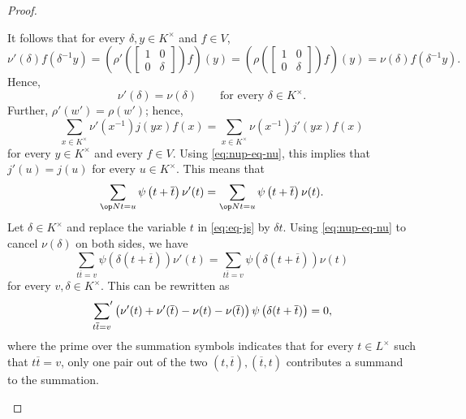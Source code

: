 \documentclass[../main.tex]{subfiles}
\begin{document}
\begin{proof}
\begin{listalph}
		It follows that for every $\delta,y\in K^\times$ and $f\in V$,
		\[\nu'(\delta)f\left(\delta^{-1}y\right)=\left(\rho'\left(\begin{bmatrix}
			1 & 0 \\
			0 & \delta
		\end{bmatrix}\right)f\right)(y)=\left(\rho\left(\begin{bmatrix}
			1 & 0 \\
			0 & \delta
		\end{bmatrix}\right)f\right)(y)=\nu(\delta)f\left(\delta^{-1}y\right).\]
		Hence,
		\begin{equation}
			\nu'(\delta) = \nu(\delta) \qquad \text{for every }\delta\in K^\times. \label{eq:nup-eq-nu}
		\end{equation}
		Further, $\rho'(w')=\rho(w')$; hence,
		\[\sum_{x\in K^\times}\nu'\left(x^{-1}\right)j(yx)f(x)=\sum_{x\in K^\times}\nu\left(x^{-1}\right)j'(yx)f(x)\]
		for every $y\in K^\times$ and every $f\in V$. Using \eqref{eq:nup-eq-nu}, this implies that $j'(u)=j(u)$ for every $u\in K^\times$. This means that
		\begin{equation}
			\sum_{\op Nt=u}\psi\left(t+\overline t\right)\nu'(t)=\sum_{\op Nt=u}\psi\left(t+\overline t\right)\nu(t). \label{eq:eq-js}
		\end{equation}
		Let $\delta\in K^\times$ and replace the variable $t$ in \eqref{eq:eq-js} by $\delta t$. Using \eqref{eq:nup-eq-nu} to cancel $\nu(\delta)$ on both sides, we have
		\[\sum_{t\overline t=v}\psi\left(\delta(t+\overline t)\right)\nu'(t)=\sum_{t\overline t=v}\psi\left(\delta(t+\overline t)\right)\nu(t)\]
		for every $v,\delta\in K^\times$. This can be rewritten as
		\begin{equation}
			\sideset{}{'}\sum_{t\overline t=v}\left(\nu'(t)+\nu'(\overline t)-\nu(t)-\nu(\overline t)\right)\psi\left(\delta(t+\overline t)\right)=0, \label{eq:almost-full-nu-eq-nup}
		\end{equation}
		where the prime over the summation symbols indicates that for every $t\in L^\times$ such that $t\overline t=v$, only one pair out of the two $(t,\overline t),(\overline t,t)$ contributes a summand to the summation.


\end{listalph}
\end{proof}
\end{document}
